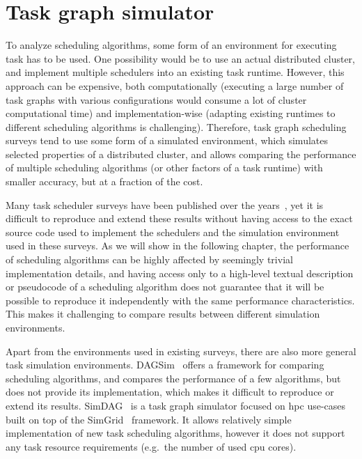 \section{Task graph simulator}
\label{sec:estee-simulator}
To analyze scheduling algorithms, some form of an environment for executing task has to be used.
One possibility would be to use an actual distributed cluster, and implement multiple schedulers
into an existing task runtime. However, this approach can be expensive, both computationally
(executing a large number of task graphs with various configurations would consume a lot of cluster
computational time) and implementation-wise (adapting existing runtimes to different scheduling
algorithms is challenging). Therefore, task graph scheduling surveys tend to use some form of a
simulated environment, which simulates selected properties of a distributed cluster, and allows
comparing the performance of multiple scheduling algorithms (or other factors of a task runtime)
with smaller accuracy, but at a fraction of the  cost.

Many task scheduler surveys have been published over the years~\cite{hlfet1974, kwok1998benchmarking, hagras2003static, sinnen2005, wang2018list}, yet it is
difficult to reproduce and extend these results without having access to the exact source code used
to implement the schedulers and the simulation environment used in these surveys. As we will show
in the following chapter, the performance of scheduling algorithms can be highly affected by
seemingly trivial implementation details, and having access only to a high-level textual
description or pseudocode of a scheduling algorithm does not guarantee that it will be possible to
reproduce it independently with the same performance characteristics. This makes it challenging to
compare results between different simulation environments.

Apart from the environments used in existing surveys, there are also more general task simulation
environments. DAGSim~\cite{dagsim} offers a framework for comparing scheduling
algorithms, and compares the performance of a few algorithms, but does not provide its
implementation, which makes it difficult to reproduce or extend its results.
SimDAG~\cite{simdag} is a task graph simulator focused on \gls{hpc}
use-cases built on top of the SimGrid~\cite{simgrid} framework. It allows relatively
simple implementation of new task scheduling algorithms, however it does not support any task
resource requirements (e.g.\ the number of used \gls{cpu} cores).

